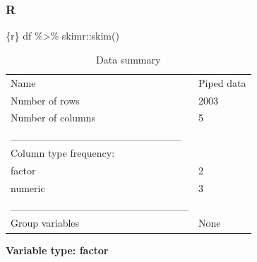 \documentclass[
  letterpaper,
  DIV=11,
  numbers=noendperiod,
  oneside]{scrreprt}
\newenvironment{Shaded}{\begin{snugshade}}{\end{snugshade}}
\newcommand{\FunctionTok}[1]{\textcolor[rgb]{0.28,0.35,0.67}{#1}}
\newcommand{\InformationTok}[1]{\textcolor[rgb]{0.37,0.37,0.37}{#1}}
\newcommand{\NormalTok}[1]{\textcolor[rgb]{0.00,0.23,0.31}{#1}}
\newcommand{\SpecialCharTok}[1]{\textcolor[rgb]{0.37,0.37,0.37}{#1}}
\begin{document}
\subsubsection{R}

\begin{Shaded}
\begin{Highlighting}[]
\InformationTok{\textasciigrave{}\textasciigrave{}\textasciigrave{}\{r\}}
\NormalTok{df }\SpecialCharTok{\%\textgreater{}\%}
\NormalTok{  skimr}\SpecialCharTok{::}\FunctionTok{skim}\NormalTok{()}
\InformationTok{\textasciigrave{}\textasciigrave{}\textasciigrave{}}
\end{Highlighting}
\end{Shaded}

\begin{longtable}[]{@{}ll@{}}
\caption{Data summary}\tabularnewline
\toprule\noalign{}
\endfirsthead
\endhead
\bottomrule\noalign{}
\endlastfoot
Name & Piped data \\
Number of rows & 2003 \\
Number of columns & 5 \\
\_\_\_\_\_\_\_\_\_\_\_\_\_\_\_\_\_\_\_\_\_\_\_ & \\
Column type frequency: & \\
factor & 2 \\
numeric & 3 \\
\_\_\_\_\_\_\_\_\_\_\_\_\_\_\_\_\_\_\_\_\_\_\_\_ & \\
Group variables & None \\
\end{longtable}

\textbf{Variable type: factor}
\end{document}
